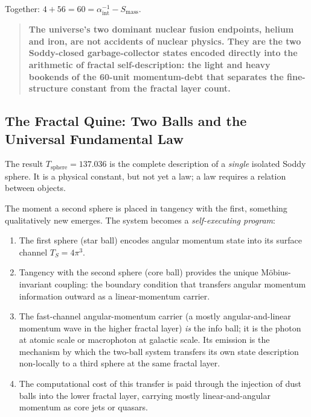 \documentclass[11pt,a4paper]{article}
\begin{document}
Together: $4 + 56 = 60 = \alpha^{-1}_{\text{int}} - S_{\text{mass}}$.

\begin{quote}
\textbf
{
The universe's two dominant nuclear fusion endpoints, helium and iron, are not accidents of nuclear physics. They are the two Soddy-closed garbage-collector states encoded directly into the arithmetic of fractal self-description: the light and heavy bookends of the 60-unit momentum-debt that separates the fine-structure constant from the fractal layer count.
}
\end{quote}

\subsection{The Fractal Quine: Two Balls and the Universal Fundamental Law}

The result $T_{\text{sphere}} = 137.036$ is the complete description of a
\emph{single} isolated Soddy sphere. It is a physical constant, but not yet a law;
a law requires a relation between objects.

The moment a second sphere is placed in tangency with the first, something
qualitatively new emerges. The system becomes a \emph{self-executing program}:

\begin{enumerate}
  \item The first sphere (star ball) encodes angular momentum state into its
        surface channel $T_S = 4\pi^3$.
  \item Tangency with the second sphere (core ball) provides the unique
        M\"obius-invariant coupling: the boundary condition that transfers angular
        momentum information outward as a linear-momentum carrier.
  \item The fast-channel angular-momentum carrier (a mostly angular-and-linear
        momentum wave in the higher fractal layer) \emph{is} the info ball; it is
        the photon at atomic scale or macrophoton at galactic scale. Its emission
        is the mechanism by which the two-ball system transfers its own state
        description non-locally to a third sphere at the same fractal layer.
  \item The computational cost of this transfer is paid through the injection of
        dust balls into the lower fractal layer, carrying mostly linear-and-angular
        momentum as core jets or quasars.
\end{enumerate}
\end{document}
